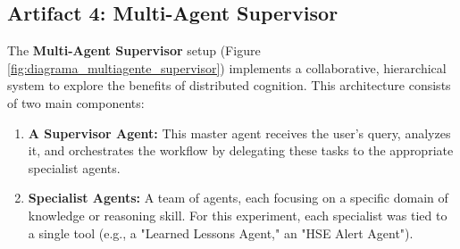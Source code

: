     
        


    \subsection{Artifact 4: Multi-Agent Supervisor}
    
        The \textbf{Multi-Agent Supervisor} setup (Figure \ref{fig:diagrama_multiagente_supervisor}) implements a collaborative, hierarchical system to explore the benefits of distributed cognition. This architecture consists of two main components:        

        \begin{enumerate}
            \item \textbf{A Supervisor Agent:} This master agent receives the user's query, analyzes it, and orchestrates the workflow by delegating these tasks to the appropriate specialist agents.
            \item \textbf{Specialist Agents:} A team of agents, each focusing on a specific domain of knowledge or reasoning skill. For this experiment, each specialist was tied to a single tool (e.g., a "Learned Lessons Agent," an "HSE Alert Agent").
        \end{enumerate}
        
